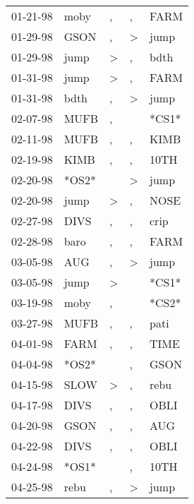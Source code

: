 \begin{supertabular}{lllll}
 01-21-98 &   moby &                , &                , &   FARM \\
 01-29-98 &   GSON &                , &     \textgreater &   jump \\
 01-29-98 &   jump &     \textgreater &                , &   bdth \\
 01-31-98 &   jump &     \textgreater &                , &   FARM \\
 01-31-98 &   bdth &                , &     \textgreater &   jump \\
 02-07-98 &   MUFB &                , &                  &  *CS1* \\
 02-11-98 &   MUFB &                , &                , &   KIMB \\
 02-19-98 &   KIMB &                , &                , &   10TH \\
 02-20-98 &  *OS2* &                  &     \textgreater &   jump \\
 02-20-98 &   jump &     \textgreater &                , &   NOSE \\
 02-27-98 &   DIVS &                , &                , &   crip \\
 02-28-98 &   baro &                , &                , &   FARM \\
 03-05-98 &    AUG &                , &     \textgreater &   jump \\
 03-05-98 &   jump &     \textgreater &                  &  *CS1* \\
 03-19-98 &   moby &                , &                  &  *CS2* \\
 03-27-98 &   MUFB &                , &                , &   pati \\
 04-01-98 &   FARM &                , &                , &   TIME \\
 04-04-98 &  *OS2* &                  &                , &   GSON \\
 04-15-98 &   SLOW &     \textgreater &                , &   rebu \\
 04-17-98 &   DIVS &                , &                , &   OBLI \\
 04-20-98 &   GSON &                , &                , &    AUG \\
 04-22-98 &   DIVS &                , &                , &   OBLI \\
 04-24-98 &  *OS1* &                  &                , &   10TH \\
 04-25-98 &   rebu &                , &     \textgreater &   jump \\

\end{supertabular}
